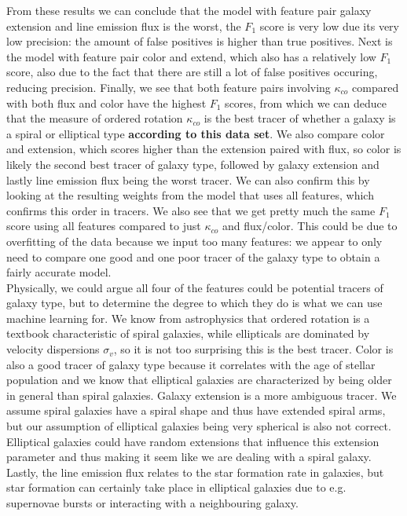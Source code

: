 From these results we can conclude that the model with feature pair galaxy extension and line emission flux is the worst, the $F_1$ score is very low due its very low precision: the amount of false positives is higher than true positives. Next is the model with feature pair color and extend, which also has a relatively low $F_1$ score, also due to the fact that there are still a lot of false positives occuring, reducing precision. Finally, we see that both feature pairs involving $\kappa_{co}$ compared with both flux and color have the highest $F_1$ scores, from which we can deduce that the measure of ordered rotation $\kappa_{co}$ is the best tracer of whether a galaxy is a spiral or elliptical type \textbf{according to this data set}. We also compare color and extension, which scores higher than the extension paired with flux, so color is likely the second best tracer of galaxy type, followed by galaxy extension and lastly line emission flux being the worst tracer. We can also confirm this by looking at the resulting weights from the model that uses all features, which confirms this order in tracers. We also see that we get pretty much the same $F_1$ score using all features compared to just $\kappa_{co}$ and flux/color. This could be due to overfitting of the data because we input too many features: we appear to only need to compare one good and one poor tracer of the galaxy type to obtain a fairly accurate model.\\

Physically, we could argue all four of the features could be potential tracers of galaxy type, but to determine the degree to which they do is what we can use machine learning for. We know from astrophysics that ordered rotation is a textbook characteristic of spiral galaxies, while ellipticals are dominated by velocity dispersions $\sigma_v$, so it is not too surprising this is the best tracer. Color is also a good tracer of galaxy type because it correlates with the age of stellar population and we know that elliptical galaxies are characterized by being older in general than spiral galaxies. Galaxy extension is a more ambiguous tracer. We assume spiral galaxies have a spiral shape and thus have extended spiral arms, but our assumption of elliptical galaxies being very spherical is also not correct. Elliptical galaxies could have random extensions that influence this extension parameter and thus making it seem like we are dealing with a spiral galaxy. Lastly, the line emission flux relates to the star formation rate in galaxies, but star formation can certainly take place in elliptical galaxies due to e.g. supernovae bursts or interacting with a neighbouring galaxy. 